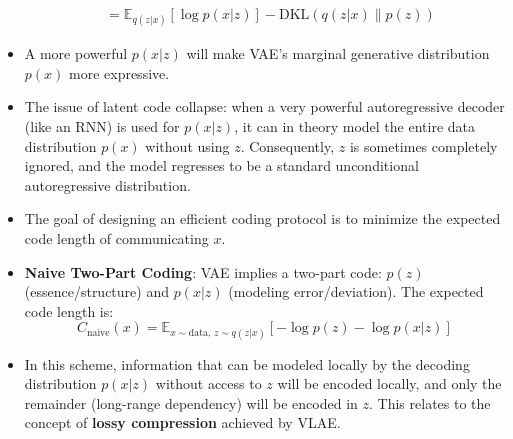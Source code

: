 \documentclass[12pt]{article}
\begin{document}
\begin{itemize}
\begin{equation}
\begin{aligned}
            &= \mathbb{E}_{q(z|x)} \left[ \log p(x|z) \right] - \mathrm{DKL}\left(q(z|x)\|p(z)\right)
        \end{aligned}
    \end{equation}
    \item A more powerful $p(x|z)$ will make VAE’s marginal generative distribution $p(x)$ more expressive.
    \item The issue of latent code collapse: when a very powerful autoregressive decoder (like an RNN) is used for $p(x|z)$, it can in theory model the entire data distribution $p(x)$ without using $z$. Consequently, $z$ is sometimes completely ignored, and the model regresses to be a standard unconditional autoregressive distribution.
    \item The goal of designing an efficient coding protocol is to minimize the expected code length of communicating $x$.
    \item \textbf{Naive Two-Part Coding}: VAE implies a two-part code: $p(z)$ (essence/structure) and $p(x|z)$ (modeling error/deviation). The expected code length is:
    \begin{equation}
        C_{\text{naive}}(x) = \mathbb{E}_{x \sim \text{data},\, z \sim q(z|x)} \left[ -\log p(z) - \log p(x|z) \right]
    \end{equation}
    \item In this scheme, information that can be modeled locally by the decoding distribution $p(x|z)$ without access to $z$ will be encoded locally, and only the remainder (long-range dependency) will be encoded in $z$. This relates to the concept of \textbf{lossy compression} achieved by VLAE.
\end{itemize}
\end{document}
